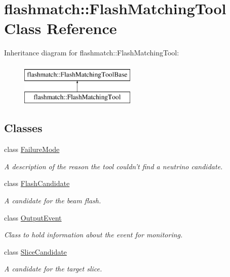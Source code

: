 \hypertarget{classflashmatch_1_1FlashMatchingTool}{\section{flashmatch\-:\-:Flash\-Matching\-Tool Class Reference}
\label{classflashmatch_1_1FlashMatchingTool}
}
Inheritance diagram for flashmatch\-:\-:Flash\-Matching\-Tool\-:\begin{figure}[H]
\begin{center}
\leavevmode
\includegraphics[height=2.000000cm]{classflashmatch_1_1FlashMatchingTool}
\end{center}
\end{figure}
\subsection*{Classes}
\begin{DoxyCompactItemize}
\item 
class \hyperlink{classflashmatch_1_1FlashMatchingTool_1_1FailureMode}{Failure\-Mode}
\begin{DoxyCompactList}\small\item\em A description of the reason the tool couldn't find a neutrino candidate. \end{DoxyCompactList}\item 
class \hyperlink{classflashmatch_1_1FlashMatchingTool_1_1FlashCandidate}{Flash\-Candidate}
\begin{DoxyCompactList}\small\item\em A candidate for the beam flash. \end{DoxyCompactList}\item 
class \hyperlink{classflashmatch_1_1FlashMatchingTool_1_1OutputEvent}{Output\-Event}
\begin{DoxyCompactList}\small\item\em Class to hold information about the event for monitoring. \end{DoxyCompactList}\item 
class \hyperlink{classflashmatch_1_1FlashMatchingTool_1_1SliceCandidate}{Slice\-Candidate}
\begin{DoxyCompactList}\small\item\em A candidate for the target slice. \end{DoxyCompactList}\end{DoxyCompactItemize}
